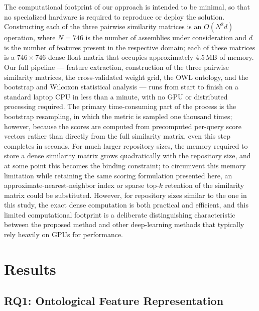 \documentclass[preprint,12pt]{elsarticle}
\begin{document}
The computational footprint of our approach is intended to be minimal, so that no specialized hardware is required to reproduce or deploy the solution.
Constructing each of the three pairwise similarity matrices is an $O(N^2 d)$ operation, where $N=746$ is the number of assemblies under consideration and $d$ is the number of features present in the respective domain; each of these matrices is a $746 \times 746$ dense float matrix that occupies approximately 4.5\,MB of memory.
Our full pipeline --- feature extraction, construction of the three pairwise similarity matrices, the cross-validated weight grid, the OWL ontology, and the bootstrap and Wilcoxon statistical analysis --- runs from start to finish on a standard laptop CPU in less than a minute, with no GPU or distributed processing required.
The primary time-consuming part of the process is the bootstrap resampling, in which the metric is sampled one thousand times; however, because the scores are computed from precomputed per-query score vectors rather than directly from the full similarity matrix, even this step completes in seconds.
For much larger repository sizes, the memory required to store a dense similarity matrix grows quadratically with the repository size, and at some point this becomes the binding constraint; to circumvent this memory limitation while retaining the same scoring formulation presented here, an approximate-nearest-neighbor index or sparse top-$k$ retention of the similarity matrix could be substituted.
However, for repository sizes similar to the one in this study, the exact dense computation is both practical and efficient, and this limited computational footprint is a deliberate distinguishing characteristic between the proposed method and other deep-learning methods that typically rely heavily on GPUs for performance.


\section{Results}

\subsection{RQ1: Ontological Feature Representation}
\end{document}
